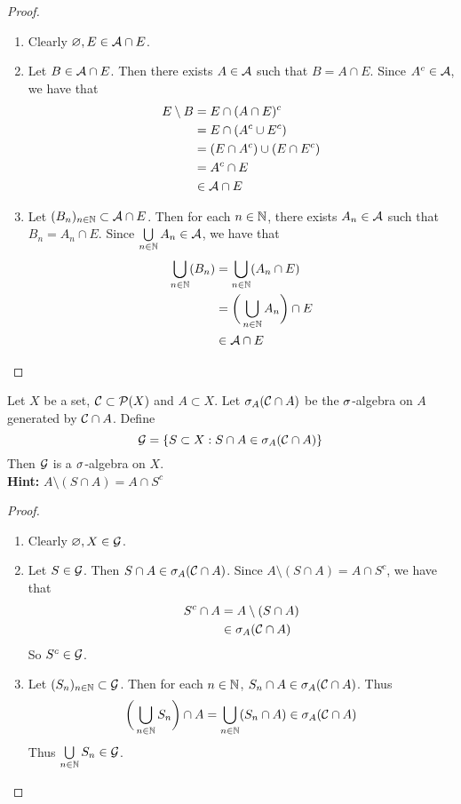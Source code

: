 \documentclass{book}
\begin{document}
	\begin{proof}\
		\begin{enumerate}
			\item Clearly $\varnothing, E \in \mathcal{A} \cap E$.
			\item Let $B \in \mathcal{A} \cap E$. Then there exists $A \in \mathcal{A}$ such that $B = A \cap E$. Since $A^c \in \mathcal{A}$, we have that 
			\begin{align*}
				E \setminus B 
				&= E \cap (A \cap E)^c \\
				&= E \cap (A^c \cup E^c) \\
				&= (E \cap A^c) \cup (E \cap E^c) \\
				&= A^c \cap E \\
				&\in \mathcal{A} \cap E
			\end{align*}
			\item Let $(B_n)_{n \in \mathbb{N}} \subset \mathcal{A} \cap E$. Then for each $n \in \mathbb{N}$, there exists $A_n \in \mathcal{A}$ such that $B_n = A_n \cap E$. Since $\bigcup\limits_{n \in \mathbb{N}}A_n \in \mathcal{A}$, we have that 
			\begin{align*}
				\bigcup_{n \in \mathbb{N}}(B_n) 
				&= \bigcup_{n \in \mathbb{N}}(A_n \cap E) \\
				&= \bigg( \bigcup_{n \in \mathbb{N}}A_n \bigg) \cap E \\
				& \in \mathcal{A} \cap E
			\end{align*}
		\end{enumerate}
	\end{proof}
	
	\begin{ex}  
		Let $X$ be a set, $\mathcal{C} \subset \mathcal{P}(X)$ and $A \subset X$. Let $\sigma_A(\mathcal{C} \cap A)$ be the $\sigma$-algebra on $A$ generated by $\mathcal{C} \cap A$. Define $$\mathcal{G} = \{S \subset X: S \cap A \in \sigma_A(\mathcal{C} \cap A)\}$$ 
		Then $\mathcal{G}$ is a $\sigma$-algebra on $X$.  \\
		\textbf{Hint:} $A \setminus (S \cap A) = A \cap S^c$
	\end{ex}
	
	\begin{proof}\
		\begin{enumerate}
			\item Clearly $\varnothing, X \in \mathcal{G}$. 
			\item Let $S \in \mathcal{G}$. Then $S \cap A \in \sigma_A(\mathcal{C} \cap A)$. Since $A \setminus (S \cap A) = A \cap S^c$, we have that 
			\begin{align*}
				S^c \cap A 
				&= A \setminus (S \cap A)  \\
				& \in \sigma_A(\mathcal{C} \cap A)
			\end{align*}				
			So $S^c \in \mathcal{G}$. 
			\item Let $(S_n)_{n \in \mathbb{N}} \subset \mathcal{G}$. Then for each $n \in \mathbb{N}$, $S_n \cap A \in \sigma_A(\mathcal{C} \cap A)$. Thus $$\bigg( \bigcup_{n \in \mathbb{N}} S_n \bigg) \cap A = \bigcup\limits_{n \in \mathbb{N}}(S_n \cap A) \in \sigma_A(\mathcal{C} \cap A)$$ Thus $\bigcup\limits_{n \in \mathbb{N}} S_n \in \mathcal{G}$.
		\end{enumerate}
	\end{proof}
	
\end{document}
